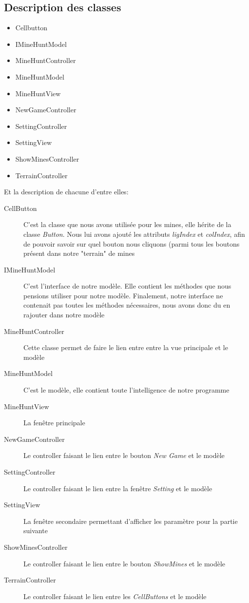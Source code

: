 \documentclass[a4paper, 10pt]{article}
\begin{document}
\subsection{Description des classes}
\begin{itemize}
\item Cellbutton
\item IMineHuntModel
\item MineHuntController
\item MineHuntModel
\item MineHuntView
\item NewGameController
\item SettingController
\item SettingView
\item ShowMinesController
\item TerrainController
\end{itemize}
\vspace{0.5cm}
Et la description de chacune d'entre elles:
\begin{description}
\item[CellButton] C'est la classe que nous avons utilisée pour les mines, elle hérite de la classe \emph{Button}. Nous lui avons ajouté les attributs \emph{ligIndex} et \emph{colIndex}, afin de pouvoir savoir sur quel bouton nous cliquons (parmi tous les boutons présent dans notre "terrain" de mines
\item[IMineHuntModel] C'est l'interface de notre modèle. Elle contient les méthodes que nous pensions utiliser pour notre modèle. Finalement, notre interface ne contenait pas toutes les méthodes nécessaires, nous avons donc du en rajouter dans notre modèle
\item[MineHuntController] Cette classe permet de faire le lien entre entre la vue principale et le modèle
\item[MineHuntModel] C'est le modèle, elle contient toute l'intelligence de notre programme
\item[MineHuntView] La fenêtre principale
\item[NewGameController] Le controller faisant le lien entre le bouton \emph{New Game} et le modèle
\item[SettingController] Le controller faisant le lien entre la fenêtre \emph{Setting} et le modèle
\item[SettingView] La fenêtre secondaire permettant d'afficher les paramètre pour la partie suivante
\item[ShowMinesController] Le controller faisant le lien entre le bouton \emph{ShowMines} et le modèle
\item[TerrainController] Le controller faisant le lien entre les \emph{CellButtons} et le modèle
\end{description}
\end{document}
